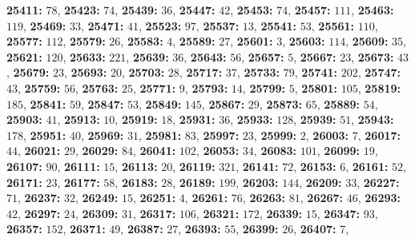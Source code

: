 \textsf{\bfseries 25411:} $78$, \textsf{\bfseries 25423:} $74$, \textsf{\bfseries 25439:} $36$, \textsf{\bfseries 25447:} $42$, \textsf{\bfseries 25453:} $74$, \textsf{\bfseries 25457:} $111$, \textsf{\bfseries 25463:} $119$, \textsf{\bfseries 25469:} $33$, \textsf{\bfseries 25471:} $41$, \textsf{\bfseries 25523:} $97$, \textsf{\bfseries 25537:} $13$, \textsf{\bfseries 25541:} $53$, \textsf{\bfseries 25561:} $110$, \textsf{\bfseries 25577:} $112$, \textsf{\bfseries 25579:} $26$, \textsf{\bfseries 25583:} $4$, \textsf{\bfseries 25589:} $27$, \textsf{\bfseries 25601:} $3$, \textsf{\bfseries 25603:} $114$, \textsf{\bfseries 25609:} $35$, \textsf{\bfseries 25621:} $120$, \textsf{\bfseries 25633:} $221$, \textsf{\bfseries 25639:} $36$, \textsf{\bfseries 25643:} $56$, \textsf{\bfseries 25657:} $5$, \textsf{\bfseries 25667:} $23$, \textsf{\bfseries 25673:} $43$, \textsf{\bfseries 25679:} $23$, \textsf{\bfseries 25693:} $20$, \textsf{\bfseries 25703:} $28$, \textsf{\bfseries 25717:} $37$, \textsf{\bfseries 25733:} $79$, \textsf{\bfseries 25741:} $202$, \textsf{\bfseries 25747:} $43$, \textsf{\bfseries 25759:} $56$, \textsf{\bfseries 25763:} $25$, \textsf{\bfseries 25771:} $9$, \textsf{\bfseries 25793:} $14$, \textsf{\bfseries 25799:} $5$, \textsf{\bfseries 25801:} $105$, \textsf{\bfseries 25819:} $185$, \textsf{\bfseries 25841:} $59$, \textsf{\bfseries 25847:} $53$, \textsf{\bfseries 25849:} $145$, \textsf{\bfseries 25867:} $29$, \textsf{\bfseries 25873:} $65$, \textsf{\bfseries 25889:} $54$, \textsf{\bfseries 25903:} $41$, \textsf{\bfseries 25913:} $10$, \textsf{\bfseries 25919:} $18$, \textsf{\bfseries 25931:} $36$, \textsf{\bfseries 25933:} $128$, \textsf{\bfseries 25939:} $51$, \textsf{\bfseries 25943:} $178$, \textsf{\bfseries 25951:} $40$, \textsf{\bfseries 25969:} $31$, \textsf{\bfseries 25981:} $83$, \textsf{\bfseries 25997:} $23$, \textsf{\bfseries 25999:} $2$, \textsf{\bfseries 26003:} $7$, \textsf{\bfseries 26017:} $44$, \textsf{\bfseries 26021:} $29$, \textsf{\bfseries 26029:} $84$, \textsf{\bfseries 26041:} $102$, \textsf{\bfseries 26053:} $34$, \textsf{\bfseries 26083:} $101$, \textsf{\bfseries 26099:} $19$, \textsf{\bfseries 26107:} $90$, \textsf{\bfseries 26111:} $15$, \textsf{\bfseries 26113:} $20$, \textsf{\bfseries 26119:} $321$, \textsf{\bfseries 26141:} $72$, \textsf{\bfseries 26153:} $6$, \textsf{\bfseries 26161:} $52$, \textsf{\bfseries 26171:} $23$, \textsf{\bfseries 26177:} $58$, \textsf{\bfseries 26183:} $28$, \textsf{\bfseries 26189:} $199$, \textsf{\bfseries 26203:} $144$, \textsf{\bfseries 26209:} $33$, \textsf{\bfseries 26227:} $71$, \textsf{\bfseries 26237:} $32$, \textsf{\bfseries 26249:} $15$, \textsf{\bfseries 26251:} $4$, \textsf{\bfseries 26261:} $76$, \textsf{\bfseries 26263:} $81$, \textsf{\bfseries 26267:} $46$, \textsf{\bfseries 26293:} $42$, \textsf{\bfseries 26297:} $24$, \textsf{\bfseries 26309:} $31$, \textsf{\bfseries 26317:} $106$, \textsf{\bfseries 26321:} $172$, \textsf{\bfseries 26339:} $15$, \textsf{\bfseries 26347:} $93$, \textsf{\bfseries 26357:} $152$, \textsf{\bfseries 26371:} $49$, \textsf{\bfseries 26387:} $27$, \textsf{\bfseries 26393:} $55$, \textsf{\bfseries 26399:} $26$, \textsf{\bfseries 26407:} $7$, 
